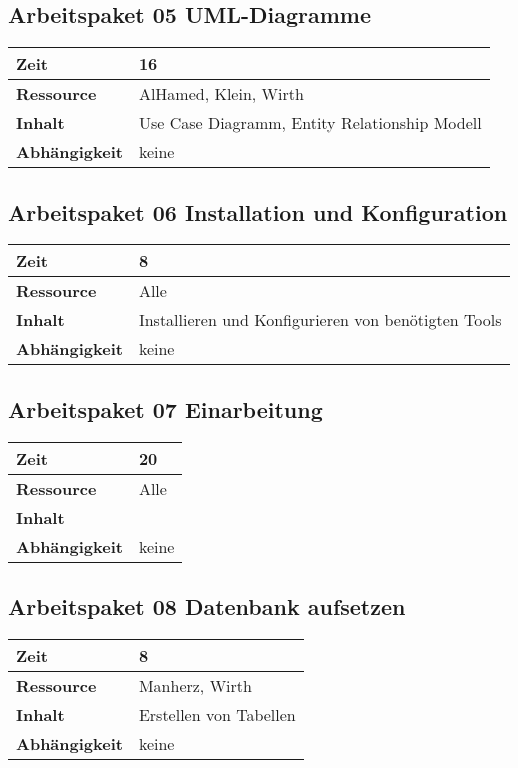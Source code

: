 \documentclass[12pt,a4paper,onecolumn]{article}
\begin{document}
\subsection{Arbeitspaket 05 UML-Diagramme}
\begin{tabularx}{\textwidth}{|l|X|}
\hline
     \textbf{Zeit} &  16\\
     \hline
     \textbf{Ressource} & AlHamed, Klein, Wirth\\
     \hline
     \textbf{Inhalt} &  Use Case Diagramm, Entity Relationship Modell\\
     \hline
     \textbf{Abhängigkeit} & keine \\
\hline
\end{tabularx}
\subsection{Arbeitspaket 06 Installation und Konfiguration}
\begin{tabularx}{\textwidth}{|l|X|}
\hline
     \textbf{Zeit} &  8\\
     \hline
     \textbf{Ressource} & Alle\\
     \hline
     \textbf{Inhalt} &  Installieren und Konfigurieren von benötigten Tools\\
     \hline
     \textbf{Abhängigkeit} & keine\\
\hline
\end{tabularx}
\subsection{Arbeitspaket 07 Einarbeitung}
\begin{tabularx}{\textwidth}{|l|X|}
\hline
     \textbf{Zeit} & 20 \\
     \hline
     \textbf{Ressource} & Alle\\
     \hline
     \textbf{Inhalt} &  \\
     \hline
     \textbf{Abhängigkeit} & keine \\
\hline
\end{tabularx}
\subsection{Arbeitspaket 08 Datenbank aufsetzen}
\begin{tabularx}{\textwidth}{|l|X|}
\hline
     \textbf{Zeit} & 8 \\
     \hline
     \textbf{Ressource} & Manherz, Wirth\\
     \hline
     \textbf{Inhalt} &  Erstellen von Tabellen\\
     \hline
     \textbf{Abhängigkeit} & keine\\
\hline
\end{tabularx}
\end{document}
